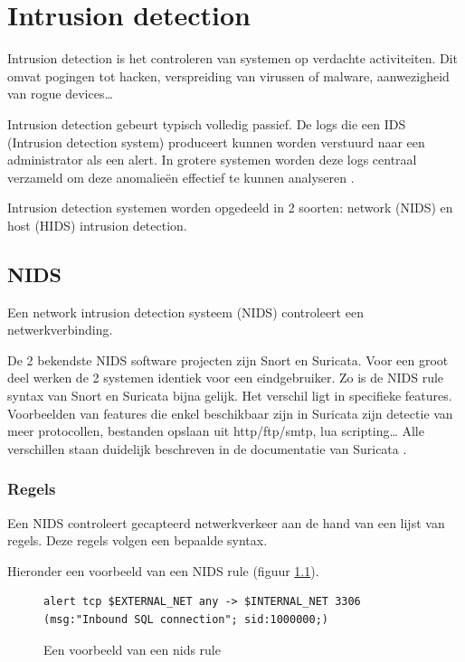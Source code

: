 \documentclass[a4paper,12pt]{report}
\begin{document}
\chapter{Intrusion detection}
Intrusion detection is het controleren van systemen op verdachte activiteiten.
Dit omvat pogingen tot hacken, verspreiding van virussen of malware, aanwezigheid van rogue devices\dots

Intrusion detection gebeurt typisch volledig passief.
De logs die een IDS (Intrusion detection system) produceert kunnen worden verstuurd naar een administrator als een alert.
In grotere systemen worden deze logs centraal verzameld om deze anomalieën effectief te kunnen analyseren \autocite{wikipedia:ids}.

Intrusion detection systemen worden opgedeeld in 2 soorten: network (NIDS) en host (HIDS) intrusion detection.

\section{NIDS}
Een network intrusion detection systeem (NIDS) controleert een netwerkverbinding.

De 2 bekendste NIDS software projecten zijn Snort en Suricata.
Voor een groot deel werken de 2 systemen identiek voor een eindgebruiker.
Zo is de NIDS rule syntax van Snort en Suricata bijna gelijk.
Het verschil ligt in specifieke features.
Voorbeelden van features die enkel beschikbaar zijn in Suricata zijn detectie van meer protocollen, bestanden opslaan uit http/ftp/smtp, lua scripting\dots
Alle verschillen staan duidelijk beschreven in de documentatie van Suricata \autocite{suricata:docs}.

\subsection{Regels}
Een NIDS controleert gecapteerd netwerkverkeer aan de hand van een lijst van regels.
Deze regels volgen een bepaalde syntax.

Hieronder een voorbeeld van een NIDS rule (figuur \ref{fig:nids-rule}).

\begin{figure}[H]
  \begin{lstlisting}
alert tcp $EXTERNAL_NET any -> $INTERNAL_NET 3306 (msg:"Inbound SQL connection"; sid:1000000;)
  \end{lstlisting}
  \caption{Een voorbeeld van een nids rule}
  \label{fig:nids-rule}
\end{figure}
\end{document}
